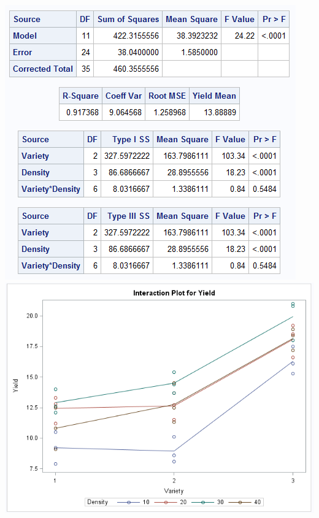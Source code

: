 \begin{center}
\includegraphics[scale=0.65]{Tomato1}\includegraphics[scale=0.5]{Tomato2}\\
\end{center}

